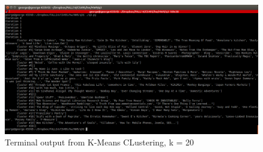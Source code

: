 \begin{figure}
\centering
\includegraphics[width=\textwidth]{../q3/clust20.png}
\caption{Terminal output from K-Means CLustering, k = 20}
\end{figure}



